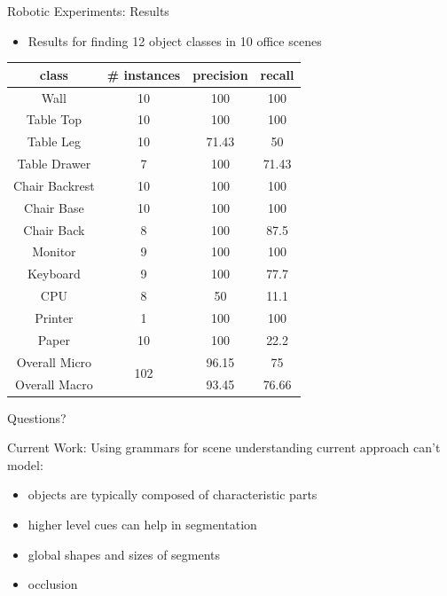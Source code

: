 \documentclass{beamer}
\begin{document}
\begin{frame}{Robotic Experiments: Results}

\begin{itemize}

\item Results for finding 12 object classes in 10 office scenes

\end{itemize}

\begin {center}
{\footnotesize 
\begin{tabular}{c | c | c | c}
class & \# instances & precision & recall \\
\hline
Wall & 10 & 100 & 100 \\
Table Top & 10 & 100  &100  \\
Table Leg & 10 & 71.43 & 50  \\
Table Drawer & 7 & 100 & 71.43 \\
Chair Backrest & 10 & 100 & 100  \\
Chair Base & 10 & 100  & 100 \\
Chair Back & 8 & 100 & 87.5 \\
Monitor & 9  & 100 & 100 \\
Keyboard & 9 & 100 & 77.7 \\
CPU & 8 & 50 & 11.1 \\ 
Printer & 1 & 100 & 100 \\
Paper & 10 & 100 & 22.2 \\
\hline
Overall Micro & \multirow{2}{*}{102} & 96.15 & 75 \\
Overall Macro & & 93.45 & 76.66 \\

\end{tabular}
}
\end{center}

\end{frame}

\begin{frame}
\begin{center}
{\Huge 
Questions?
}
\end{center}
\end{frame}

\begin{frame}{Current Work: Using grammars for scene understanding}
current approach can't model:
\begin{itemize}
\item objects are typically composed of characteristic parts
\item higher level cues can help in segmentation
\item global shapes and sizes of segments
\item occlusion
\end{itemize}

\end{frame}
\end{document}
